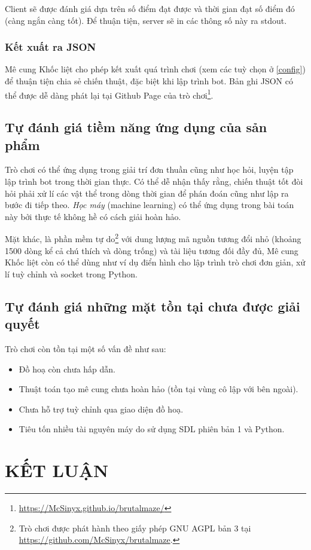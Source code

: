 \documentclass[a4paper,12pt]{article}
\begin{document}
Client sẽ được đánh giá dựa trên số điểm đạt được và thời gian đạt số điểm đó
(càng ngắn càng tốt). Để thuận tiện, server sẽ in các thông số này ra stdout.

\subsubsection{Kết xuất ra JSON}
Mê cung Khốc liệt cho phép kết xuất quá trình chơi (xem các tuỳ chọn ở
\ref{config}) để thuận tiện chia sẻ chiến thuật, đặc biệt khi lập trình bot.
Bản ghi JSON có thể được dễ dàng phát lại tại Github Page của
trò chơi\footnote{\url{https://McSinyx.github.io/brutalmaze/}}.

\subsection{Tự đánh giá tiềm năng ứng dụng của sản phẩm}
Trò chơi có thể ứng dụng trong giải trí đơn thuần cũng như học hỏi, luyện tập
lập trình bot trong thời gian thực. Có thể dễ nhận thấy rằng, chiến thuật tốt
đòi hỏi phải xử lí các vật thể trong dòng thời gian để phán đoán cũng như lập ra
bước đi tiếp theo. \emph{Học máy} (machine learning) có thể ứng dụng trong bài
toán này bởi thực tế không hề có cách giải hoàn hảo.

Mặt khác, là phần mềm tự do\footnote{Trò chơi được phát hành theo giấy phép GNU
AGPL bản 3 tại \url{https://github.com/McSinyx/brutalmaze}.} với dung
lượng mã nguồn tương đổi nhỏ (khoảng 1500 dòng kể cả chú thích và dòng trống) và
tài liệu tương đối đầy đủ, Mê cung Khốc liệt còn có thể dùng như ví dụ điển hình
cho lập trình trò chơi đơn giản, xử lí tuỳ chỉnh và socket trong Python.

\subsection{Tự đánh giá những mặt tồn tại chưa được giải quyết}
Trò chơi còn tồn tại một số vấn đề như sau:
\begin{itemize}
  \item Đồ hoạ còn chưa hấp dẫn.
  \item Thuật toán tạo mê cung chưa hoàn hảo
    (tồn tại vùng cô lập với bên ngoài).
  \item Chưa hỗ trợ tuỳ chỉnh qua giao diện đồ hoạ.
  \item Tiêu tốn nhiều tài nguyên máy do sử dụng SDL phiên bản 1 và Python.
\end{itemize}

\newpage
\section{KẾT LUẬN}
\end{document}
